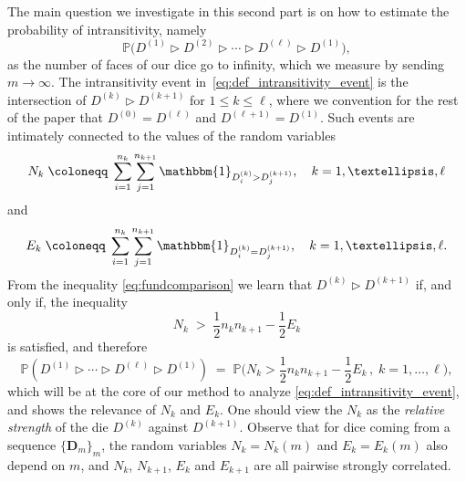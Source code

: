 \documentclass[reqno,a4paper,11pt]{amsart}
\newcommand{\btt}{\triangleright}
\theoremstyle{remark}
\newcommand{\mb}[1]{{\mathbf #1}}
\newcommand{\bb}[1]{{\mathbb #1}}
\newcommand{\ind}{\mathbbm{1}}
\numberwithin{equation}{section}
\begin{document}
The main question we investigate in this second part is on how to estimate the probability of intransitivity, namely
\begin{equation}
\label{eq:def_intransitivity_event}
\bb P\big({D^{(1)} \btt D^{(2)} \btt \cdots \btt D^{(\ell)} \btt D^{(1)}}\big),
\end{equation}
%
as the number of faces of our dice go to infinity, which we measure by sending $m\to\infty$.
The intransitivity event in~\eqref{eq:def_intransitivity_event} is the
intersection of $D^{(k)} \btt D^{(k+1)}$ for $1 \le k \le \ell$, where we convention for the rest of the paper that $D^{(0)} = D^{(\ell)}$ and $D^{(\ell+1)} = D^{(1)}$. Such events are intimately connected to the values of the random variables
\begin{equation}
\label{eq:def_Nk}
N_{k} \;\coloneqq\; \sum_{i=1}^{n_k}\sum_{j=1}^{n_{k+1}}
    \ind_{{{D}_i^{(k)}>D_{j}^{(k+1)}}},\quad k=1,\dots, \ell
\end{equation}
%
and
%
\begin{equation}
\label{eq:def_Ek}
E_k\;\coloneqq\; \sum_{i=1}^{n_k}\sum_{j=1}^{n_{k+1}}
    \ind_{{{D}_i^{(k)}=D_{j}^{(k+1)}}},\quad k=1,\dots, \ell.
\end{equation}
%
From the inequality \eqref{eq:fundcomparison} we learn that $D^{(k)}\btt D^{(k+1)}$ if, and only if, the inequality
%
\begin{equation*}
N_k\;>\;\frac{1}{2}n_kn_{k+1}-\frac{1}{2}E_k
\end{equation*}
%
is satisfied, and therefore
%
\begin{equation}\label{eq:ineqNkEk}
\bb P\left({D^{(1)} \btt \cdots \btt D^{(\ell)} \btt D^{(1)}}\right)\;=\;
\bb P\Big(N_k>\frac{1}{2}n_kn_{k+1}-\frac{1}{2}E_k\,,\; k=1,\hdots,\ell\Big),
\end{equation}
%
which will be at the core of our method to analyze \eqref{eq:def_intransitivity_event}, and shows the relevance of $N_k$ and $E_k$. One should view the $N_k$ as the {\it relative strength} of the die $D^{(k)}$ against $D^{(k+1)}$.
%
Observe that for dice coming from a sequence $\{\mb D_m\}_m$, the random variables $N_k=N_k(m)$ and $E_k=E_k(m)$ also depend on $m$, and $N_{k}$, $N_{k+1}$, $E_k$ and $E_{k+1}$ are all pairwise strongly correlated.
\end{document}

